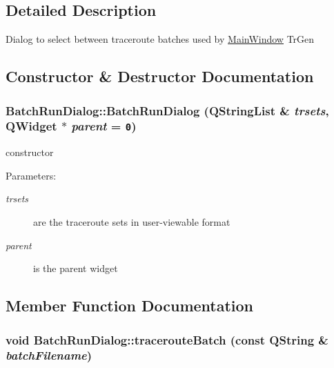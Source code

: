\subsection{Detailed Description}
Dialog to select between traceroute batches used by \hyperlink{classMainWindow}{MainWindow} TrGen 

\subsection{Constructor \& Destructor Documentation}
\hypertarget{classBatchRunDialog_39e08a5d575b43830615ccc1e4a28d39}{
\subsubsection[BatchRunDialog]{\setlength{\rightskip}{0pt plus 5cm}BatchRunDialog::BatchRunDialog (QStringList \& {\em trsets}, \/  QWidget $\ast$ {\em parent} = {\tt 0})}}
\label{classBatchRunDialog_39e08a5d575b43830615ccc1e4a28d39}


constructor \begin{Desc}
\item[Parameters:]
\begin{description}
\item[{\em trsets}]are the traceroute sets in user-viewable format \item[{\em parent}]is the parent widget \end{description}
\end{Desc}


\subsection{Member Function Documentation}
\hypertarget{classBatchRunDialog_80b5c170f4a32dfdd3be57ab18e376cf}{
\subsubsection[tracerouteBatch]{\setlength{\rightskip}{0pt plus 5cm}void BatchRunDialog::tracerouteBatch (const QString \& {\em batchFilename})}}
\label{classBatchRunDialog_80b5c170f4a32dfdd3be57ab18e376cf}


